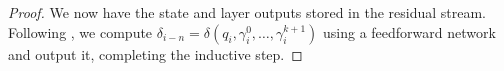 \begin{proof}
    We now have the state and layer outputs stored in the residual stream.
    Following , we compute $\delta_{i-n} = \delta(q_i, \gamma^0_i, \ldots, \gamma^{k + 1}_i)$ using a feedforward network and output it, completing the inductive step.

\end{proof}